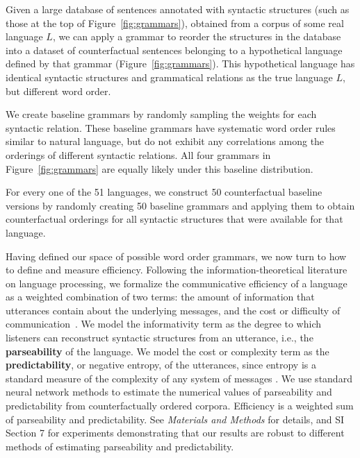 \documentclass[9pt,twocolumn,twoside,lineno]{pnas-new}
\newcommand{\key}[1]{\textbf{#1}}
\begin{document}
Given a large database of sentences annotated with syntactic structures (such as those at the top of Figure~\ref{fig:grammars}), obtained from a corpus of some real language $L$, we can apply a grammar to reorder the structures in the database into a dataset of counterfactual sentences belonging to a hypothetical language defined by that grammar (Figure~\ref{fig:grammars}).
This hypothetical language has identical syntactic structures and grammatical relations as the true language $L$, but different word order.

We create baseline grammars by randomly sampling the weights for each syntactic relation.
These baseline grammars have systematic word order rules similar to natural language, but do not exhibit any correlations among the orderings of different syntactic relations.
All four grammars in Figure~\ref{fig:grammars} are equally likely under this baseline distribution.

For every one of the 51 languages, we construct 50 counterfactual baseline versions by randomly creating 50 baseline grammars and applying them to obtain counterfactual orderings for all syntactic structures that were available for that language.

Having defined our space of possible word order grammars, we now turn to how to define and measure efficiency. 
Following the information-theoretical literature on language processing, 
we formalize the communicative efficiency of a language as a weighted combination of two terms:  the 
amount of information that utterances contain about the underlying messages, and the  cost or difficulty of communication~\cite{ferreri2003least,frank2012predicting,zaslavsky2018efficient,kemp2012kinship,regier2015word,goodman2013knowledge}.
We model the informativity term as the 
 degree to which listeners can reconstruct syntactic structures from an utterance, i.e., the \key{parseability} of the language. We model the cost or complexity term as the 
 \key{predictability}, or negative entropy, of the utterances, since entropy is a standard measure of the complexity of any system of messages \cite{shannon1948mathematical}.
 We use standard neural network methods to estimate the numerical values of parseability and predictability from counterfactually ordered corpora.
 Efficiency is a weighted sum of parseability and predictability.
 See \textit{Materials and Methods} for details, and SI Section 7 for experiments demonstrating that our results are robust to different methods of estimating parseability and predictability.
\end{document}
